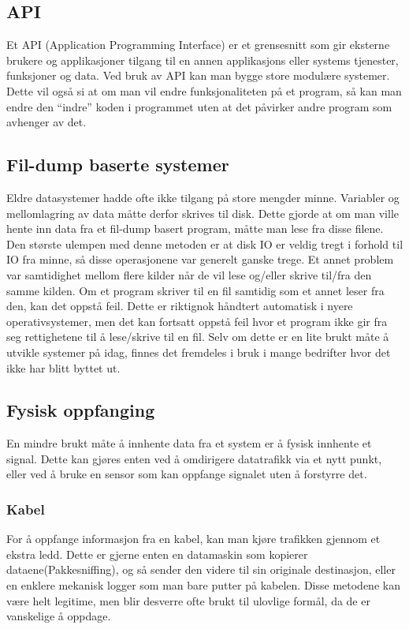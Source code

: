 \documentclass[../main.tex]{subfiles}
\begin{document}
\subsection{API}
Et API (Application Programming Interface) er et grensesnitt som gir eksterne brukere og applikasjoner tilgang til en annen applikasjons eller systems tjenester, funksjoner og data. Ved bruk av API kan man bygge store modulære systemer. Dette vil også si at om man vil endre funksjonaliteten på et program, så kan man endre den “indre” koden i programmet uten at det påvirker andre program som avhenger av det.

\subsection{Fil-dump baserte systemer}
Eldre datasystemer hadde ofte ikke tilgang på store mengder minne. Variabler og mellomlagring av data måtte derfor skrives til disk. Dette gjorde at om man ville hente inn data fra et fil-dump basert program, måtte man lese fra disse filene. Den største ulempen med denne metoden er at disk IO er veldig tregt i forhold til IO fra minne, så disse operasjonene var generelt ganske trege. Et annet problem var samtidighet mellom flere kilder når de vil lese og/eller skrive til/fra den samme kilden. Om et program skriver til en fil samtidig som et annet leser fra den, kan det oppstå feil. Dette er riktignok håndtert automatisk i nyere operativsystemer, men det kan fortsatt oppstå feil hvor et program ikke gir fra seg rettighetene til å lese/skrive til en fil.
Selv om dette er en lite brukt måte å utvikle systemer på idag, finnes det fremdeles i bruk i mange bedrifter hvor det ikke har blitt byttet ut.

\subsection{Fysisk oppfanging}
En mindre brukt måte å innhente data fra et system er å fysisk innhente et signal. Dette kan gjøres enten ved å omdirigere datatrafikk via et nytt punkt, eller ved å bruke en sensor som kan oppfange signalet uten å forstyrre det.

\subsubsection{Kabel}
For å oppfange informasjon fra en kabel, kan man kjøre trafikken gjennom et ekstra ledd. Dette er gjerne enten en datamaskin som kopierer dataene(Pakkesniffing), og så sender den videre til sin originale destinasjon, eller en enklere mekanisk logger som man bare putter på kabelen. Disse metodene kan være helt legitime, men blir desverre ofte brukt til ulovlige formål, da de er vanskelige å oppdage.
\end{document}
